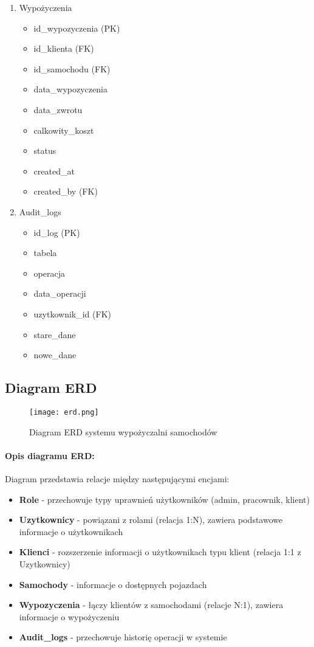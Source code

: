 \documentclass[12pt]{article}
\begin{document}
\begin{enumerate}
    \item Wypożyczenia
    \begin{itemize}
        \item id\_wypozyczenia (PK)
        \item id\_klienta (FK)
        \item id\_samochodu (FK)
        \item data\_wypozyczenia
        \item data\_zwrotu
        \item calkowity\_koszt
        \item status
        \item created\_at
        \item created\_by (FK)
    \end{itemize}

    \item Audit\_logs
    \begin{itemize}
        \item id\_log (PK)
        \item tabela
        \item operacja
        \item data\_operacji
        \item uzytkownik\_id (FK)
        \item stare\_dane
        \item nowe\_dane
    \end{itemize}
\end{enumerate}
\subsection{Diagram ERD}
\begin{figure}[H]
    \centering
    \texttt{[image: erd.png]}
    \caption{Diagram ERD systemu wypożyczalni samochodów}
    \label{fig:erd}
\end{figure}

\paragraph{Opis diagramu ERD:}
Diagram przedstawia relacje między następującymi encjami:
\begin{itemize}
    \item \textbf{Role} - przechowuje typy uprawnień użytkowników (admin, pracownik, klient)
    \item \textbf{Uzytkownicy} - powiązani z rolami (relacja 1:N), zawiera podstawowe informacje o użytkownikach
    \item \textbf{Klienci} - rozszerzenie informacji o użytkownikach typu klient (relacja 1:1 z Uzytkownicy)
    \item \textbf{Samochody} - informacje o dostępnych pojazdach
    \item \textbf{Wypozyczenia} - łączy klientów z samochodami (relacje N:1), zawiera informacje o wypożyczeniu
    \item \textbf{Audit\_logs} - przechowuje historię operacji w systemie
\end{itemize}
\end{document}
